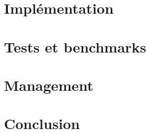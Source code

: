 \documentclass[a4paper, 11pt]{report}
\begin{document}
\chapter{Implémentation}


\chapter{Tests et benchmarks}


\chapter{Management}


\chapter{Conclusion}

\end{document}
